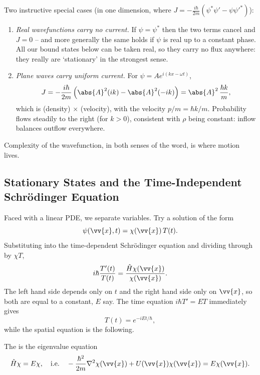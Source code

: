 \begin{example}
    Two instructive special cases (in one dimension, where $J = -\frac{i\hbar}{2m}(\psi^* \psi' - \psi \psi'^*)$):
    \begin{enumerate}[label=(\roman*)]
        \item \emph{Real wavefunctions carry no current.} If $\psi = \psi^*$ then the two terms cancel and $J = 0$ -- and more generally the same holds if $\psi$ is real up to a constant phase. All our bound states below can be taken real, so they carry no flux anywhere: they really are `stationary' in the strongest sense.
        \item \emph{Plane waves carry uniform current.} For $\psi = A e^{i(kx - \omega t)}$,
        $$
        J = -\frac{i \hbar}{2m}\left( \abs{A}^2 (ik) - \abs{A}^2 (-ik) \right) = \abs{A}^2 \, \frac{\hbar k}{m},
        $$
        which is (density) $\times$ (velocity), with the velocity $p/m = \hbar k/m$. Probability flows steadily to the right (for $k > 0$), consistent with $\rho$ being constant: inflow balances outflow everywhere.
    \end{enumerate}
    Complexity of the wavefunction, in both senses of the word, is where motion lives.
\end{example}

\subsection{Stationary States and the Time-Independent Schr\"odinger Equation}

Faced with a linear PDE, we separate variables. Try a solution of the form
$$
\psi(\vv{x}, t) = \chi(\vv{x}) \, T(t).
$$
Substituting into the time-dependent Schr\"odinger equation and dividing through by $\chi T$,
$$
i \hbar \frac{T'(t)}{T(t)} = \frac{\hat{H} \chi(\vv{x})}{\chi(\vv{x})}.
$$
The left hand side depends only on $t$ and the right hand side only on $\vv{x}$, so both are equal to a constant, $E$ say. The time equation $i \hbar T' = E T$ immediately gives
$$
T(t) = e^{-iEt/\hbar},
$$
while the spatial equation is the following.

\begin{definition}
    The  is the eigenvalue equation
    $$
    \hat{H} \chi = E \chi, \quad \text{i.e.} \quad -\frac{\hbar^2}{2m} \nabla^2 \chi(\vv{x}) + U(\vv{x}) \chi(\vv{x}) = E \chi(\vv{x}).
    $$
\end{definition}

